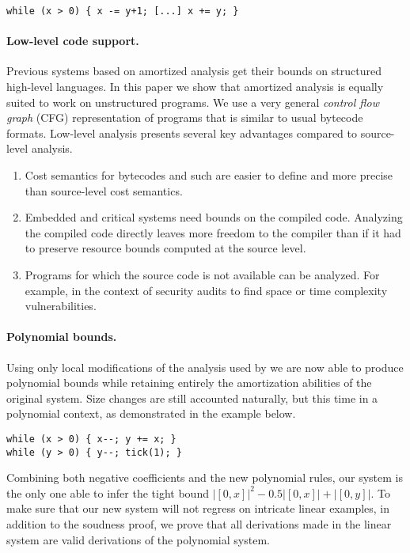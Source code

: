 \documentclass[nocopyrightspace,preprint]{sigplanconf-pldi15}
\begin{document}
\begin{lstlisting}
while (x > 0) { x -= y+1; [...] x += y; }
\end{lstlisting}

\paragraph{Low-level code support.}
Previous systems based on amortized analysis get their
bounds on structured high-level languages.  In this paper
we show that amortized analysis is equally suited to
work on unstructured programs.  We use a very general
\emph{control flow graph} (CFG) representation of programs
that is similar to usual bytecode formats.
Low-level analysis presents several key advantages compared
to source-level analysis.
\begin{enumerate}
\item Cost semantics for bytecodes and such are easier to
      define and more precise than source-level cost
      semantics.
\item Embedded and critical systems need bounds on the
      compiled code.  Analyzing the compiled code directly
      leaves more freedom to the compiler than if it had
      to preserve resource bounds computed at the source
      level.
\item Programs for which the source code is not available
      can be analyzed.  For example, in the context of
      security audits to find space or time complexity
      vulnerabilities.
\end{enumerate}

\paragraph{Polynomial bounds.}
Using only local modifications of the analysis used by
\toolname{} we are now able to produce polynomial bounds
while retaining entirely the amortization abilities of
the original system.  Size changes are still accounted
naturally, but this time in a polynomial context, as
demonstrated in the example below.
%
\begin{lstlisting}
while (x > 0) { x--; y += x; }
while (y > 0) { y--; tick(1); }
\end{lstlisting}
%
Combining both negative coefficients and the new
polynomial rules, our system is the only one able
to infer the tight bound $|[0,x]|^2 - 0.5 |[0,x]| +
|[0,y]|$.  To make sure that our new
system will not regress on intricate
linear examples, in addition to the soudness proof,
we prove that all derivations made in the linear
system are valid derivations of the polynomial
system.
\end{document}
